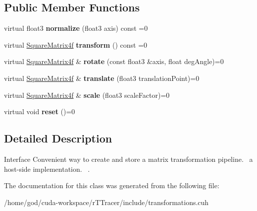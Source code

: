 \subsection*{Public Member Functions}
\begin{DoxyCompactItemize}
\item 
virtual float3 {\bfseries normalize} (float3 axis) const =0\hypertarget{class_pipeline_a45a5dd1398482de5c9fd57ada431229d}{}\label{class_pipeline_a45a5dd1398482de5c9fd57ada431229d}

\item 
virtual \hyperlink{class_square_matrix4}{Square\+Matrix4f} {\bfseries transform} () const =0\hypertarget{class_pipeline_a8d5faa6d841fb9e6cc2527d904ad6bee}{}\label{class_pipeline_a8d5faa6d841fb9e6cc2527d904ad6bee}

\item 
virtual \hyperlink{class_square_matrix4}{Square\+Matrix4f} \& {\bfseries rotate} (const float3 \&axis, float deg\+Angle)=0\hypertarget{class_pipeline_a2b50d058b74ce266e58acd4ab1622ef9}{}\label{class_pipeline_a2b50d058b74ce266e58acd4ab1622ef9}

\item 
virtual \hyperlink{class_square_matrix4}{Square\+Matrix4f} \& {\bfseries translate} (float3 translation\+Point)=0\hypertarget{class_pipeline_a7c12b9fa044a6341e08d5639c9ee7db4}{}\label{class_pipeline_a7c12b9fa044a6341e08d5639c9ee7db4}

\item 
virtual \hyperlink{class_square_matrix4}{Square\+Matrix4f} \& {\bfseries scale} (float3 scale\+Factor)=0\hypertarget{class_pipeline_a60ed7a51148b346075ad5aa23c766d30}{}\label{class_pipeline_a60ed7a51148b346075ad5aa23c766d30}

\item 
virtual void {\bfseries reset} ()=0\hypertarget{class_pipeline_a632192d4703d48e1e7fec206c6dcddf7}{}\label{class_pipeline_a632192d4703d48e1e7fec206c6dcddf7}

\end{DoxyCompactItemize}


\subsection{Detailed Description}
Interface  Convenient way to create and store a matrix transformation pipeline.~\newline
 a host-\/side implementation.~\newline
. 

The documentation for this class was generated from the following file\+:\begin{DoxyCompactItemize}
\item 
/home/god/cuda-\/workspace/r\+T\+Tracer/include/transformations.\+cuh\end{DoxyCompactItemize}
